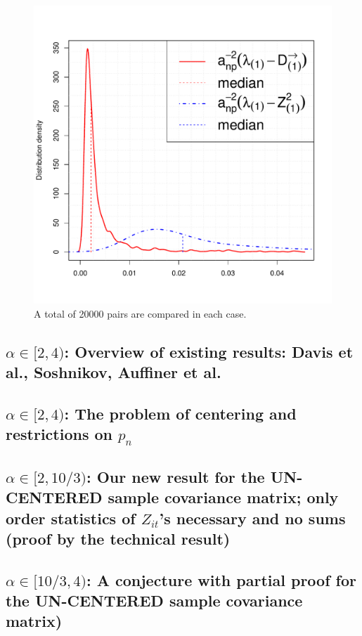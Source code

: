 \documentclass[11pt,reqno]{amsart}
\newcommand{\1}{\mathds{1}}
\newcommand{\0}{\boldsymbol{0}}
\newcommand{\4}{\mathchoice{\mskip1.5mu}{\mskip1.5mu}{}{}}
\newcommand{\5}{\mathchoice{\mskip-1.5mu}{\mskip-1.5mu}{}{}}
\newcommand{\2}{\penalty250\mskip\thickmuskip\mskip-\thinmuskip} %
\begin{document}
\begin{figure}[htb!]
  \centering
  \includegraphics[scale=0.40]{lambda_comparison.pdf}
  \caption{A total of 20000 pairs are compared in each case.}
  \label{fig:lambda_comparison}
\end{figure}




\subsection{$\alpha \in [2,4)$: Overview of existing results: Davis et
  al., Soshnikov, Auffiner et al.} 
\subsection{$\alpha \in [2,4)$: The problem of centering and restrictions on $p_n$}
\subsection{$\alpha \in [2,10/3)$: Our new result for the UN-CENTERED
  sample covariance matrix; only order statistics of $Z_{it}$'s
  necessary and no sums (proof by the technical result)}
\subsection{$\alpha \in [10/3,4)$: A conjecture with partial proof for
  the UN-CENTERED sample covariance matrix)}
\end{document}
